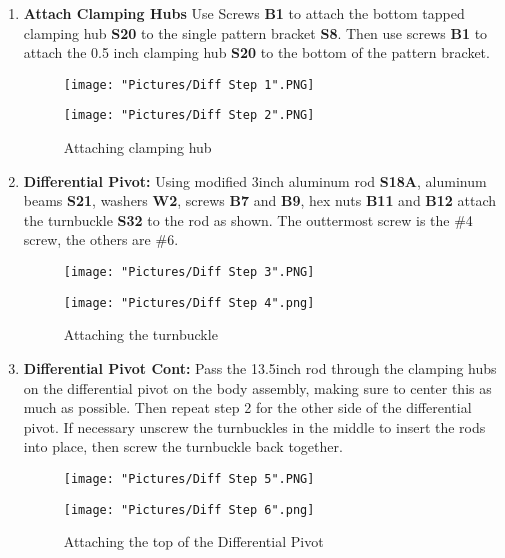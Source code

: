 \documentclass[12pt]{article}
\begin{document}
\begin{enumerate}
\item \textbf{Attach Clamping Hubs} Use Screws \textbf{B1} to attach the bottom tapped clamping hub \textbf{S20} to the single pattern bracket \textbf{S8}. Then use screws \textbf{B1} to attach the 0.5 inch clamping hub \textbf{S20} to the bottom of the pattern bracket.

\begin{figure}[H]
  \centering
  \begin{minipage}[b]{0.45\textwidth}
    \texttt{[image: "Pictures/Diff Step 1".PNG]}
  \end{minipage}
  \hfill
  \begin{minipage}[b]{0.45\textwidth}
    \texttt{[image: "Pictures/Diff Step 2".PNG]}
  \end{minipage}
  \caption{Attaching clamping hub}
\end{figure}

\item \textbf{Differential Pivot:} Using modified 3inch aluminum rod \textbf{S18A}, aluminum beams \textbf{S21}, washers \textbf{W2}, screws \textbf{B7} and \textbf{B9}, hex nuts \textbf{B11} and \textbf{B12} attach the turnbuckle \textbf{S32} to the rod as shown. The outtermost screw is the \#4 screw, the others are \#6.

\begin{figure}[H]
  \centering
  \begin{minipage}[b]{0.45\textwidth}
    \texttt{[image: "Pictures/Diff Step 3".PNG]}
  \end{minipage}
  \hfill
  \begin{minipage}[b]{0.45\textwidth}
    \texttt{[image: "Pictures/Diff Step 4".png]}
  \end{minipage}
  \caption{Attaching the turnbuckle}
\end{figure}

\item \textbf{Differential Pivot Cont:} Pass the 13.5inch rod through the clamping hubs on the differential pivot on the body assembly, making sure to center this as much as possible. Then repeat step 2 for the other side of the differential pivot. If necessary unscrew the turnbuckles in the middle to insert the rods into place, then screw the turnbuckle back together. 

\begin{figure}[H]
  \centering
  \begin{minipage}[b]{0.45\textwidth}
    \texttt{[image: "Pictures/Diff Step 5".PNG]}
  \end{minipage}
  \hfill
  \begin{minipage}[b]{0.45\textwidth}
    \texttt{[image: "Pictures/Diff Step 6".png]}
  \end{minipage}
  \caption{Attaching the top of the Differential Pivot}
\end{figure}


\end{enumerate}
\end{document}
